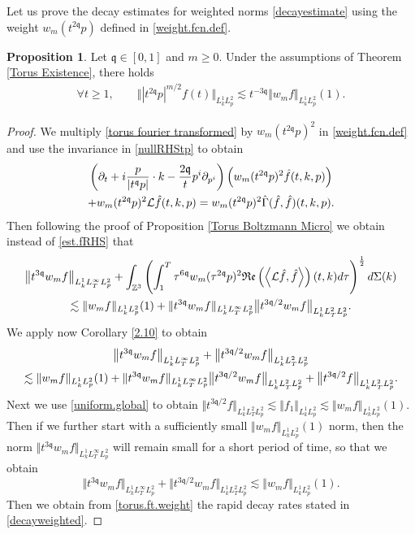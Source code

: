 \documentclass[reqno]{amsart}
\newcommand{\pv}{p}
\def\norm#1{\big\Vert#1\big\Vert}
\newcommand{\irnp}[2]{\left\langle {#1},{#2} \right\rangle}
\newcommand{\qq}{\mathfrak{q}}
\newcommand{\tq}{t^{\qq}}
\newcommand{\tqq}{t^{2\qq}}
\newcommand{\tTq}{t^{3\qq}}
\newcommand{\linL}{\mathcal{L}}
\newcommand{\Z}{\mathbb{Z}}
\newcommand{\real}[1]{\mathfrak{Re}\left(#1\right)}
\theoremstyle{definition}
\newtheorem{proposition}[theorem]{Proposition}
\numberwithin{equation}{section}
\numberwithin{theorem}{section}
\begin{document}
Let us prove the decay estimates for weighted norms \eqref{decayestimate} using the weight $w_m(\tqq\pv)$ defined in \eqref{weight.fcn.def}.

\begin{proposition}\label{prop:weightenergy}
    Let \(\qq\in [0,1]\) and \(m\geq 0\). Under the assumptions of Theorem \ref{Torus Existence}, there holds \begin{align}
\forall t\geq 1, \qquad\Vert |t^{2\qq}\pv|^{m/2}{f}(t)\Vert_{L^1_kL^2_{\pv}}
\lesssim  t^{-3\qq}\Vert w_m{f}\Vert_{L^1_kL^2_{\pv}}(1).\label{decayweighted}
\end{align}
\end{proposition}

\begin{proof}
We multiply \eqref{torus fourier transformed} by $w_m(\tqq\pv)^2$ in \eqref{weight.fcn.def} and use the invariance in \eqref{nullRHStp} to obtain
\begin{multline}\notag
   \left(\partial_t  + i\frac{\pv}{|\tq \pv|}\cdot k 
-\frac{2\qq }{t} p^i \partial_{p^i} \right) \left( w_m(\tqq\pv)^2 \hat{f}(t,k,\pv)\right)
\\
+w_m(\tqq\pv)^2\linL\hat{f}(t,k,\pv)=w_m(\tqq\pv)^2\hat{\Gamma}(\hat{f},\hat{f})(t,k,\pv). 
\end{multline}
Then following the proof of Proposition \ref{Torus Boltzmann Micro} we obtain instead of \eqref{est.fRHS} that
\begin{multline}
\norm{\tTq w_mf}_{L^1_kL^\infty_TL^2_{\pv}}
+
\int_{\Z^3}\left(\int^T_1  \tau^{6\qq} w_m(\tau^{2\qq}\pv)^2\real{\irnp{\linL\hat{f}}{\hat{f}}}(t,k)d\tau\right)^{\frac12} d\Sigma(k)
\\
\lesssim 
\Vert w_m {f}\Vert_{L^1_kL^2_{\pv}}(1)
+{\Vert{\tTq w_mf}\Vert_{L^1_kL^\infty_TL^2_{\pv}}} {\norm{t^{3\qq/2} w_m f}_{L^1_kL^2_TL^2_{\pv}}}.
\notag
\end{multline}
We apply now Corollary \ref{2.10} to obtain
\begin{multline}\notag
\norm{\tTq w_mf}_{L^1_kL^\infty_TL^2_{\pv}}
+
{\norm{t^{3\qq/2} w_m f}_{L^1_kL^2_TL^2_{\pv}}}
\\
\lesssim 
\Vert w_m {f}\Vert_{L^1_kL^2_{\pv}}(1)
+{\Vert{\tTq w_mf}\Vert_{L^1_kL^\infty_TL^2_{\pv}}} {\norm{t^{3\qq/2} w_m f}_{L^1_kL^2_TL^2_{\pv}}}
+
\norm{t^{3\qq/2}f}_{L^1_kL^2_TL^2_{\pv}}.
\end{multline}
Next we use \eqref{uniform.global} to obtain $\norm{t^{3\qq/2}f}_{L^1_kL^2_TL^2_{\pv}} \lesssim 
\norm{ {f}_1}_{L^1_kL^2_{\pv}} \lesssim \Vert w_m {f}\Vert_{L^1_kL^2_{\pv}}(1)$.  Then if we further start with a  sufficiently small $\Vert w_m {f}\Vert_{L^1_kL^2_{\pv}}(1)$ norm, then the norm ${\Vert{\tTq w_mf}\Vert_{L^1_kL^\infty_TL^2_{\pv}}}$ will remain small for a short period of time, so that we obtain
\begin{equation}
    \norm{\tTq w_mf}_{L^1_kL^\infty_TL^2_{\pv}}
+
{\norm{t^{3\qq/2} w_m f}_{L^1_kL^2_TL^2_{\pv}}}
\lesssim 
\Vert w_m {f}\Vert_{L^1_kL^2_{\pv}}(1).
\label{torus.ft.weight}
\end{equation}
Then we obtain from \eqref{torus.ft.weight} the rapid decay rates stated in \eqref{decayweighted}. 
\end{proof}
\end{document}
